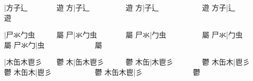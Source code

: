 \begingroup\mktsStyleCode{}{\cjk{}{\cnsym{}　　　　　　}}|{\cjk{}方子辶{\cnsym{}　　　　}遊} 
{\cjk{}{\cnsym{}　　　　　}方}|{\cjk{}子辶{\cnsym{}　　　　　}遊} 
{\cjk{}{\cnsym{}　　　　}方}|{\cjk{}子辶{\cnsym{}　　　　　　}遊} 
{\cjk{}{\cnsym{}　　　}方子}|{\cjk{}辶{\cnsym{}　　　　　　　}遊} 
\endgroup{}{}

\endgroup{}\begingroup\mktsObeyAllLines{}

\begingroup\mktsStyleCode{}{\cjk{}{\cnsym{}　　　　　　}}|{\cjk{}尸氺勹虫{\cnsym{}　　　}屬} 
{\cjk{}{\cnsym{}　　　　　}尸}|{\cjk{}氺勹虫{\cnsym{}　　　　}屬} 
{\cjk{}{\cnsym{}　　　　}尸氺}|{\cjk{}勹虫{\cnsym{}　　　　　}屬} 
{\cjk{}{\cnsym{}　　　}尸氺}|{\cjk{}勹虫{\cnsym{}　　　　　　}屬} 
{\cjk{}{\cnsym{}　　}尸氺勹}|{\cjk{}虫{\cnsym{}　　　　　　　}屬} 
\endgroup{}{}

\endgroup{}\begingroup\mktsObeyAllLines{}

\begingroup\mktsStyleCode{}{\cjk{}{\cnsym{}　　　　　　}}|{\cjk{}木缶木鬯彡{\cnsym{}　　}鬱} 
{\cjk{}{\cnsym{}　　　　　}木}|{\cjk{}缶木鬯彡{\cnsym{}　　　}鬱} 
{\cjk{}{\cnsym{}　　　　}木缶}|{\cjk{}木鬯彡{\cnsym{}　　　　}鬱} 
{\cjk{}{\cnsym{}　　　}木缶木}|{\cjk{}鬯彡{\cnsym{}　　　　　}鬱} 
{\cjk{}{\cnsym{}　　}木缶木}|{\cjk{}鬯彡{\cnsym{}　　　　　　}鬱} 
{\cjk{}{\cnsym{}　}木缶木鬯}|{\cjk{}彡{\cnsym{}　　　　　　　}鬱} 
\endgroup{}{}

\endgroup{}\begin{multicols}{2}
\mktsShowpar\par
\end{multicols}
